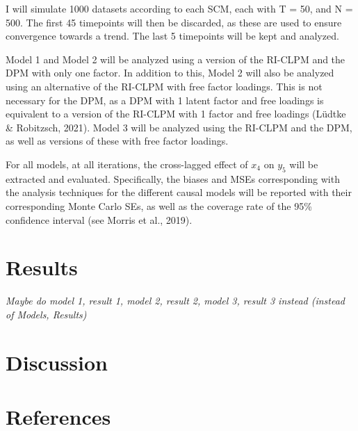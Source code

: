 \documentclass[
]{interact}
\begin{document}
I will simulate 1000 datasets according to each SCM, each with T = 50,
and N = 500. The first 45 timepoints will then be discarded, as these
are used to ensure convergence towards a trend. The last 5 timepoints
will be kept and analyzed.

Model 1 and Model 2 will be analyzed using a version of the RI-CLPM and
the DPM with only one factor. In addition to this, Model 2 will also be
analyzed using an alternative of the RI-CLPM with free factor loadings.
This is not necessary for the DPM, as a DPM with 1 latent factor and
free loadings is equivalent to a version of the RI-CLPM with 1 factor
and free loadings (Lüdtke \& Robitzsch, 2021). Model 3 will be analyzed
using the RI-CLPM and the DPM, as well as versions of these with free
factor loadings.

For all models, at all iterations, the cross-lagged effect of \(x_4\) on
\(y_5\) will be extracted and evaluated. Specifically, the biases and
MSEs corresponding with the analysis techniques for the different causal
models will be reported with their corresponding Monte Carlo SEs, as
well as the coverage rate of the 95\% confidence interval (see Morris et
al., 2019).

\hypertarget{results}{%
\section{Results}\label{results}}

\emph{Maybe do model 1, result 1, model 2, result 2, model 3, result 3
instead (instead of Models, Results)}

\hypertarget{discussion}{%
\section{Discussion}\label{discussion}}

\newpage{}

\hypertarget{references}{%
\section*{References}\label{references}}
\end{document}
